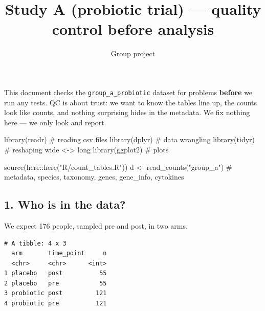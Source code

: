 \documentclass[
  letterpaper,
  DIV=11,
  numbers=noendperiod]{scrartcl}
\title{Study A (probiotic trial) --- quality control before analysis}
\author{Group project}
\date{}
\newenvironment{Shaded}{\begin{snugshade}}{\end{snugshade}}
\newcommand{\CommentTok}[1]{\textcolor[rgb]{0.37,0.37,0.37}{#1}}
\newcommand{\FunctionTok}[1]{\textcolor[rgb]{0.28,0.35,0.67}{#1}}
\newcommand{\NormalTok}[1]{\textcolor[rgb]{0.00,0.23,0.31}{#1}}
\newcommand{\OtherTok}[1]{\textcolor[rgb]{0.00,0.23,0.31}{#1}}
\newcommand{\SpecialCharTok}[1]{\textcolor[rgb]{0.37,0.37,0.37}{#1}}
\newcommand{\StringTok}[1]{\textcolor[rgb]{0.13,0.47,0.30}{#1}}
\begin{document}
\maketitle


This document checks the \texttt{group\_a\_probiotic} dataset for
problems \textbf{before} we run any tests. QC is about trust: we want to
know the tables line up, the counts look like counts, and nothing
surprising hides in the metadata. We fix nothing here --- we only look
and report.

\begin{Shaded}
\begin{Highlighting}[]
\FunctionTok{library}\NormalTok{(readr)     }\CommentTok{\# reading csv files}
\FunctionTok{library}\NormalTok{(dplyr)     }\CommentTok{\# data wrangling}
\FunctionTok{library}\NormalTok{(tidyr)     }\CommentTok{\# reshaping wide \textless{}{-}\textgreater{} long}
\FunctionTok{library}\NormalTok{(ggplot2)   }\CommentTok{\# plots}

\FunctionTok{source}\NormalTok{(here}\SpecialCharTok{::}\FunctionTok{here}\NormalTok{(}\StringTok{"R/count\_tables.R"}\NormalTok{))}
\NormalTok{d }\OtherTok{\textless{}{-}} \FunctionTok{read\_counts}\NormalTok{(}\StringTok{"group\_a"}\NormalTok{)   }\CommentTok{\# metadata, species, taxonomy, genes, gene\_info, cytokines}
\end{Highlighting}
\end{Shaded}

\subsection{1. Who is in the data?}\label{who-is-in-the-data}

We expect 176 people, sampled pre and post, in two arms.

\begin{Shaded}
\end{Shaded}

\begin{verbatim}
# A tibble: 4 x 3
  arm       time_point     n
  <chr>     <chr>      <int>
1 placebo   post          55
2 placebo   pre           55
3 probiotic post         121
4 probiotic pre          121
\end{verbatim}
\end{document}
